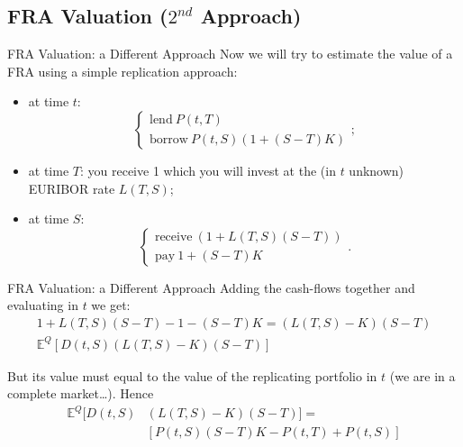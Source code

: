 \documentclass{beamer}
\begin{document}
\subsection{FRA Valuation ($2^{nd}$ Approach)}
\begin{frame}{FRA Valuation: a Different Approach}
	Now we will try to estimate the value of a FRA using a simple replication approach:
	\begin{itemize}
		\item at time $t$: 
		\begin{equation*}
			\begin{cases}
				\text{lend}~P(t,T)\\
				\text{borrow}~P(t,S)(1+(S-T)K)
			\end{cases};
		\end{equation*}
		\item at time $T$: you receive 1 which you will invest at the (in $t$ unknown) EURIBOR rate $L(T,S)$;
		\item at time $S$: 
		\begin{equation*}
			\begin{cases}
				\text{receive}~(1+L(T,S)(S-T))\\
				\text{pay}~1 + (S-T)K
			\end{cases}.
		\end{equation*}
	\end{itemize}
\end{frame}

\begin{frame}{FRA Valuation: a Different Approach}
	Adding the cash-flows together and evaluating in $t$ we get:
	\begin{equation*}
		\begin{gathered}
			1+L(T,S)(S-T) - 1 - (S-T)K = (L(T,S)-K)(S-T) \\
			\mathbb{E}^Q[D(t, S)(L(T, S)-K)(S-T)]
		\end{gathered}
	\end{equation*}
	
	But its value must equal to the value of the replicating portfolio in $t$ (we are in a complete market\ldots). Hence
	\begin{equation}
		\begin{aligned}
			\mathbb{E}^Q[D(t,S)&(L(T,S)-K)(S-T)]=\\
			&[P(t,S)(S-T)K-P(t,T)+P(t,S)]
		\end{aligned}
	\end{equation}
\end{frame}
\end{document}
